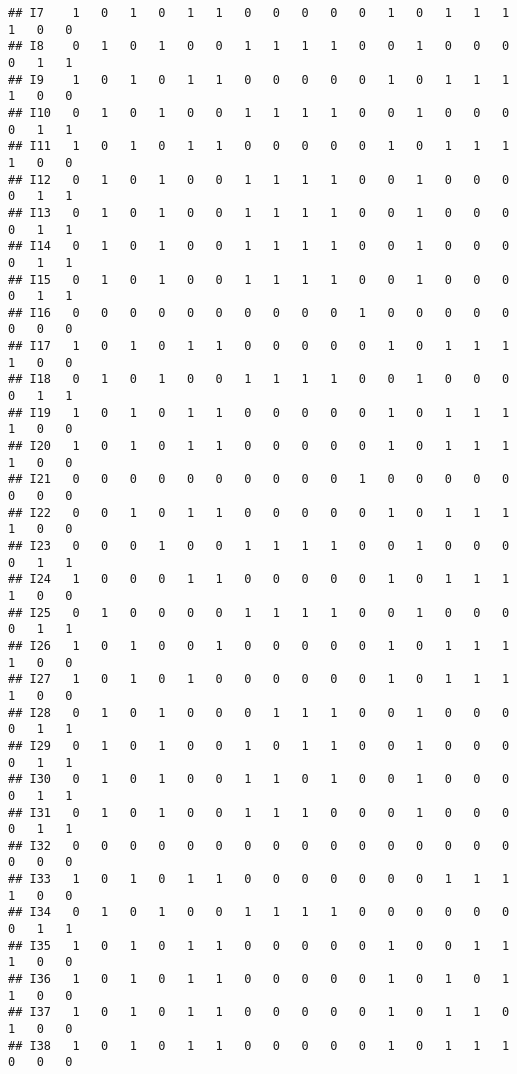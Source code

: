 \documentclass[
]{article}
\begin{document}
\begin{verbatim}
## I7    1   0   1   0   1   1   0   0   0   0   0   1   0   1   1   1   1   0   0
## I8    0   1   0   1   0   0   1   1   1   1   0   0   1   0   0   0   0   1   1
## I9    1   0   1   0   1   1   0   0   0   0   0   1   0   1   1   1   1   0   0
## I10   0   1   0   1   0   0   1   1   1   1   0   0   1   0   0   0   0   1   1
## I11   1   0   1   0   1   1   0   0   0   0   0   1   0   1   1   1   1   0   0
## I12   0   1   0   1   0   0   1   1   1   1   0   0   1   0   0   0   0   1   1
## I13   0   1   0   1   0   0   1   1   1   1   0   0   1   0   0   0   0   1   1
## I14   0   1   0   1   0   0   1   1   1   1   0   0   1   0   0   0   0   1   1
## I15   0   1   0   1   0   0   1   1   1   1   0   0   1   0   0   0   0   1   1
## I16   0   0   0   0   0   0   0   0   0   0   1   0   0   0   0   0   0   0   0
## I17   1   0   1   0   1   1   0   0   0   0   0   1   0   1   1   1   1   0   0
## I18   0   1   0   1   0   0   1   1   1   1   0   0   1   0   0   0   0   1   1
## I19   1   0   1   0   1   1   0   0   0   0   0   1   0   1   1   1   1   0   0
## I20   1   0   1   0   1   1   0   0   0   0   0   1   0   1   1   1   1   0   0
## I21   0   0   0   0   0   0   0   0   0   0   1   0   0   0   0   0   0   0   0
## I22   0   0   1   0   1   1   0   0   0   0   0   1   0   1   1   1   1   0   0
## I23   0   0   0   1   0   0   1   1   1   1   0   0   1   0   0   0   0   1   1
## I24   1   0   0   0   1   1   0   0   0   0   0   1   0   1   1   1   1   0   0
## I25   0   1   0   0   0   0   1   1   1   1   0   0   1   0   0   0   0   1   1
## I26   1   0   1   0   0   1   0   0   0   0   0   1   0   1   1   1   1   0   0
## I27   1   0   1   0   1   0   0   0   0   0   0   1   0   1   1   1   1   0   0
## I28   0   1   0   1   0   0   0   1   1   1   0   0   1   0   0   0   0   1   1
## I29   0   1   0   1   0   0   1   0   1   1   0   0   1   0   0   0   0   1   1
## I30   0   1   0   1   0   0   1   1   0   1   0   0   1   0   0   0   0   1   1
## I31   0   1   0   1   0   0   1   1   1   0   0   0   1   0   0   0   0   1   1
## I32   0   0   0   0   0   0   0   0   0   0   0   0   0   0   0   0   0   0   0
## I33   1   0   1   0   1   1   0   0   0   0   0   0   0   1   1   1   1   0   0
## I34   0   1   0   1   0   0   1   1   1   1   0   0   0   0   0   0   0   1   1
## I35   1   0   1   0   1   1   0   0   0   0   0   1   0   0   1   1   1   0   0
## I36   1   0   1   0   1   1   0   0   0   0   0   1   0   1   0   1   1   0   0
## I37   1   0   1   0   1   1   0   0   0   0   0   1   0   1   1   0   1   0   0
## I38   1   0   1   0   1   1   0   0   0   0   0   1   0   1   1   1   0   0   0

\end{verbatim}
\end{document}
